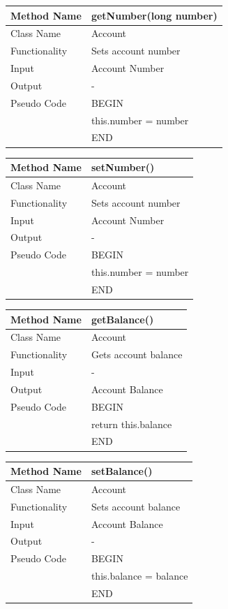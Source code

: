\documentclass[12pt]{article}
\begin{document}
\begin{tabular}{ |p{3cm}||p{\colWidth}|  }
	\hline
	Method Name &  getNumber(long number)\\
	\hline
	Class Name & Account\\
	\hline
	Functionality & Sets account number\\
	\hline
	Input & Account Number\\
	\hline
	Output & -\\
	\hline
	Pseudo Code&BEGIN\\ & this.number = number\\&END\\
	\hline
\end{tabular}  

\begin{tabular}{ |p{3cm}||p{\colWidth}|  }
	\hline
	Method Name &  setNumber()\\
	\hline
	Class Name & Account\\
	\hline
	Functionality & Sets account number\\
	\hline
	Input & Account Number\\
	\hline
	Output & -\\
	\hline
	Pseudo Code&BEGIN\\ & this.number = number\\&END\\
	\hline
\end{tabular}   

\begin{tabular}{ |p{3cm}||p{\colWidth}|  }
	\hline
	Method Name &  getBalance()\\
	\hline
	Class Name & Account\\
	\hline
	Functionality & Gets account balance\\
	\hline
	Input & -\\
	\hline
	Output & Account Balance\\
	\hline
	Pseudo Code &BEGIN\\& return this.balance\\&END\\
	\hline
\end{tabular}

\begin{tabular}{ |p{3cm}||p{\colWidth}|  }
	\hline
	Method Name &  setBalance()\\
	\hline
	Class Name & Account\\
	\hline
	Functionality & Sets account balance\\
	\hline
	Input & Account Balance\\
	\hline
	Output & -\\
	\hline
	Pseudo Code &BEGIN\\& this.balance = balance\\&END\\
	\hline
\end{tabular}
\end{document}
